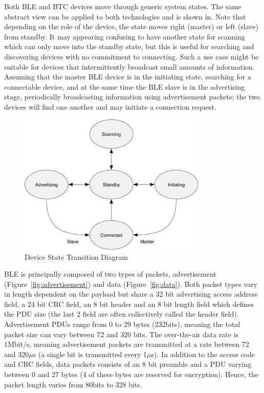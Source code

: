 \documentclass[]{article}
\begin{document}
Both BLE and BTC devices move through generic system states. The same abstract view can be applied to both technologies and is shown in. Note that depending on the role of the device, the state moves right (master) or left (slave) from standby. It may appearing confusing to have another state for scanning which can only move into the standby state, but this is useful for searching and discovering devices with no commitment to connecting. Such a use case might be suitable for devices that intermittently broadcast small amounts of information. Assuming that the master BLE device is in the initiating state, searching for a connectable device, and at the same time the BLE slave is in the advertising stage, periodically broadcasting information using advertisement packets; the two devices will find one another and may initiate a connection request.

\begin{figure}[htb]
	\begin{center}
		\includegraphics[width = 0.8\textwidth]{systemstate}
	\end{center}
	\caption{Device State Transition Diagram}
	\label{fig:systemstate}
\end{figure}

\ac{BLE} is principally composed of two types of packets, advertisement (Figure~\ref{fig:advertisement}) and data (Figure~\ref{fig:data}). Both packet types vary in length dependent on the payload but share a 32 bit advertising access address field, a 24 bit \ac{CRC} field, an 8 bit header and an 8 bit length field which defines the \ac{PDU} size (the last 2 field are often collectively called the header field). Advertisement \ac{PDU}s range from 0 to 29 bytes (232bits), meaning the total packet size can vary between 72 and 320 bits. The over-the-air data rate is 1Mbit/s, meaning advertisement packets are transmitted at a rate between 72 and 320$\mu$s (a single bit is transmitted every 1$\mu$s). In addition to the access code and \ac{CRC} fields, data packets consists of an 8 bit preamble and a \ac{PDU} varying between 0 and 27 bytes (4 of these bytes are reserved for encryption). Hence, the packet length varies from 80bits to 328 bits. 
\end{document}
